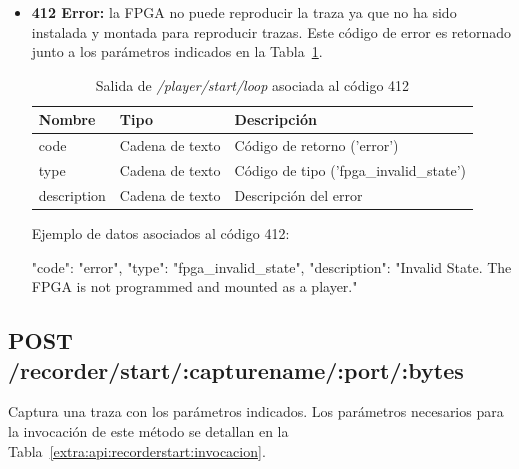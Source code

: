 \begin{itemize}
{\begin{minipage}{\textwidth}
Ejemplo de datos asociados al código 400:

\begin{code}[language=json]
{
  "code": "error",
  "type": "notification",
  "description": "Invalid parameters. The FPGA could not start playing a capture."
}
\end{code}
\end{minipage}
}

\item{\textbf{412 Error:} la \gls{FPGA} no puede reproducir la \gls{traza} ya que no ha sido instalada y montada para reproducir \glspl{traza}.
Este código de error es retornado junto a los parámetros indicados en la Tabla~\ref{extra:api:playerstartloop:error412}.
\begin{table}[H]
\centering
\begin{tabular}{|l|l|l|}
\hline
\rowcolor[HTML]{F5F5F5}
\textbf{Nombre}  & \textbf{Tipo}   & \textbf{Descripción}                    \\ \hline
code             & Cadena de texto & Código de retorno ('error')             \\ \hline
type             & Cadena de texto & Código de tipo ('fpga\_invalid\_state') \\ \hline
description      & Cadena de texto & Descripción del error                   \\ \hline
\end{tabular}
\caption{Salida de \textit{/player/start/loop} asociada al código 412}
\label{extra:api:playerstartloop:error412}
\end{table}

\begin{minipage}{\textwidth}
Ejemplo de datos asociados al código 412:

\begin{code}[language=json]
{
  "code": "error",
  "type": "fpga_invalid_state",
  "description": "Invalid State. The FPGA is not programmed and mounted as a player."
}
\end{code}
\end{minipage}
}

\end{itemize}

%
%
\subsection{POST /recorder/start/:capturename/:port/:bytes}
Captura una \gls{traza} con los parámetros indicados.
Los parámetros necesarios para la invocación de este método se detallan en la Tabla~\ref{extra:api:recorderstart:invocacion}.

